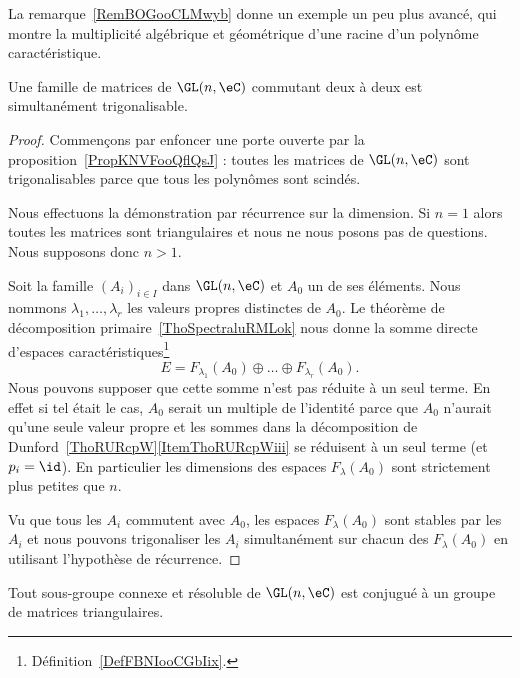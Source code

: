 La remarque~\ref{RemBOGooCLMwyb} donne un exemple un peu plus avancé, qui montre la multiplicité algébrique et géométrique d'une racine d'un polynôme caractéristique.

\begin{lemma}   \label{LemSLGPooIghEPI}
    Une famille de matrices de \( \GL(n,\eC)\) commutant deux à deux est simultanément trigonalisable.
\end{lemma}

\begin{proof}
    Commençons par enfoncer une porte ouverte par la proposition~\ref{PropKNVFooQflQsJ} : toutes les matrices de \( \GL(n,\eC)\) sont trigonalisables parce que tous les polynômes sont scindés.

    Nous effectuons la démonstration par récurrence sur la dimension. Si \( n=1\) alors toutes les matrices sont triangulaires et nous ne nous posons pas de questions. Nous supposons donc \( n>1\).

    Soit la famille \( (A_i)_{i\in I}\) dans \( \GL(n,\eC)\) et \( A_0\) un de ses éléments. Nous nommons \( \lambda_1,\ldots, \lambda_r\) les valeurs propres distinctes de \( A_0\). Le théorème de décomposition primaire~\ref{ThoSpectraluRMLok} nous donne la somme directe d'espaces caractéristiques\footnote{Définition~\ref{DefFBNIooCGbIix}.}
    \begin{equation}
        E=F_{\lambda_1}(A_0)\oplus\ldots\oplus F_{\lambda_r}(A_0).
    \end{equation}
    Nous pouvons supposer que cette somme n'est pas réduite à un seul terme. En effet si tel était le cas, \( A_0\) serait un multiple de l'identité parce que \( A_0\) n'aurait qu'une seule valeur propre et les sommes dans la décomposition de Dunford~\ref{ThoRURcpW}\ref{ItemThoRURcpWiii} se réduisent à un seul terme (et \( p_i=\id\)). En particulier les dimensions des espaces \( F_{\lambda}(A_0)\) sont strictement plus petites que \( n\).

    Vu que tous les \( A_i\) commutent avec \( A_0\), les espaces \( F_{\lambda}(A_0)\) sont stables par les \( A_i\) et nous pouvons trigonaliser les \( A_i\) simultanément sur chacun des \( F_{\lambda}(A_0)\) en utilisant l'hypothèse de récurrence.
\end{proof}

\begin{theorem}  \label{ThoUWQBooCvutTO}
    Tout sous-groupe connexe et résoluble de \( \GL(n,\eC)\) est conjugué à un groupe de matrices triangulaires.
\end{theorem}

